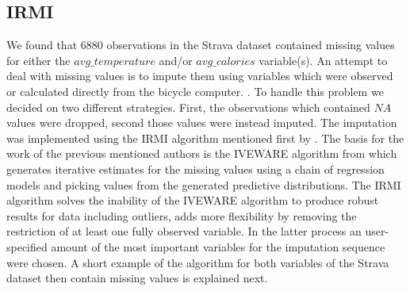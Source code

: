 \documentclass[12pt,a4paper]{article}
\begin{document}
\hypertarget{irmi}{%
\subsection{IRMI}\label{irmi}}

We found that 6880 observations in the Strava dataset contained missing values for either the \(avg\_temperature\) and/or \(avg\_calories\) variable(s).
An attempt to deal with missing values is to impute them using variables which were observed or calculated directly from the bicycle computer. . To handle this problem we decided on two different strategies. First, the observations which contained \(NA\) values were dropped, second those values were instead imputed. The imputation was implemented using the IRMI algorithm mentioned first by \textcite{Templ2011}. The basis for the work of the previous mentioned authors is the IVEWARE algorithm from \textcite{Raghunathan01} which generates iterative estimates for the missing values using a chain of regression models and picking values from the generated predictive distributions. The IRMI algorithm solves the inability of the IVEWARE algorithm to produce robust results for data including outliers, adds more flexibility by removing the restriction of at least one fully observed variable. In the latter process an user-specified amount of the most important variables for the imputation sequence were chosen. A short example of the algorithm for both variables of the Strava dataset then contain missing values is explained next.
\end{document}
